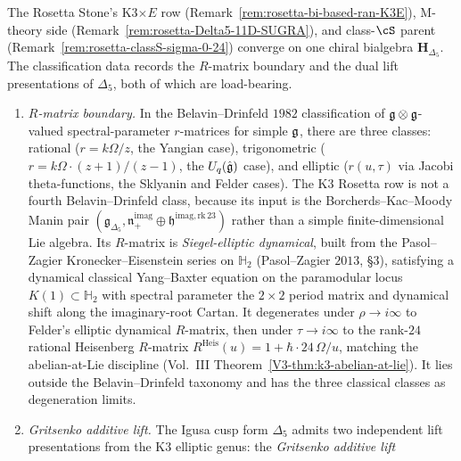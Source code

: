 \begin{remark}
\label{rem:drinfeld-classification-rosetta-R-sieg}%
%
%
%
The Rosetta Stone's K3$\times E$ row
(Remark~\ref{rem:rosetta-bi-based-ran-K3E}),
M-theory side (Remark~\ref{rem:rosetta-Delta5-11D-SUGRA}), and
class-$\cS$ parent (Remark~\ref{rem:rosetta-classS-sigma-0-24})
converge on one chiral bialgebra $\mathbf{H}_{\Delta_5}$. The
classification data records the $R$-matrix boundary and the dual lift
presentations of $\Delta_5$, both of which are load-bearing.
\begin{enumerate}[label=\textup{(D\arabic*)}]
\item \emph{$R$-matrix boundary.} In the Belavin--Drinfeld $1982$
 classification of $\mathfrak{g}\otimes\mathfrak{g}$-valued spectral-parameter $r$-matrices
 for simple $\mathfrak{g}$, there are three classes: rational ($r = k\Omega/z$,
 the Yangian case), trigonometric
 ($r = k\Omega\cdot (z+1)/(z-1)$, the $U_q(\hat{\mathfrak{g}})$ case), and
 elliptic ($r(u,\tau)$ via Jacobi theta-functions, the Sklyanin and
 Felder cases). The K3 Rosetta row is not a fourth
 Belavin--Drinfeld class, because its input is the
 Borcherds--Kac--Moody Manin pair
 $(\mathfrak g_{\Delta_5},\mathfrak n_+^{\mathrm{imag}}
 \oplus\mathfrak h^{\mathrm{imag,rk\,23}})$ rather than a simple
 finite-dimensional Lie algebra. Its $R$-matrix is
 \emph{Siegel-elliptic dynamical}, built from the Pasol--Zagier
 Kronecker--Eisenstein series on $\mathbb{H}_2$
 \textup{(}Pasol--Zagier $2013$, \S $3$\textup{)}, satisfying a
 dynamical classical Yang--Baxter equation on the paramodular locus
 $K(1)\subset\mathbb{H}_2$ with spectral parameter the
 $2\times 2$ period matrix and dynamical shift along the imaginary-root
 Cartan. It degenerates under $\rho\to i\infty$ to Felder's elliptic
 dynamical $R$-matrix, then under $\tau\to i\infty$ to the rank-$24$
 rational Heisenberg $R$-matrix
 $R^{\mathrm{Heis}}(u) = 1 + \hbar\cdot 24\,\Omega/u$, matching the
 abelian-at-Lie discipline
 \textup{(}Vol.~III Theorem~\ref{V3-thm:k3-abelian-at-lie}\textup{)}.
 It lies outside the Belavin--Drinfeld taxonomy and has the three
 classical classes as degeneration limits.
\item \emph{Gritsenko additive lift.} The Igusa cusp form $\Delta_5$
 admits two independent lift presentations from the K3 elliptic genus:
 the \emph{Gritsenko additive lift}

\end{enumerate}
\end{remark}
